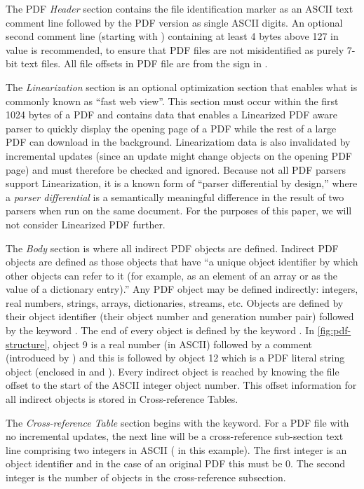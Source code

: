 The PDF \emph{Header} section contains the file identification marker as an ASCII
text comment line  followed by the PDF version as single ASCII digits. 
An optional second comment line (starting with \lstcd{\%})
containing at least 4 bytes above 127 in value is recommended, to ensure 
that PDF files are not misidentified as purely 7-bit text files. 
All file offsets in PDF file are from the \lstcd{\%} sign in .  

The \emph{Linearization} section is an optional optimization section that enables what is commonly
known as ``fast web view''. This section must occur within the first 1024 bytes of a PDF and contains
data that enables a Linearized PDF aware parser to quickly display the opening page of a PDF
while the rest of a large PDF can download in the background.
Linearizatiom data is also invalidated by incremental updates (since an update might change objects
on the opening PDF page) and must therefore be checked and ignored.
%
Because not all PDF parsers support Linearization, it is a known form
of ``parser differential by design,'' where a \emph{parser
  differential} is a semantically meaningful difference in the result
of two parsers when run on the same document.
%
For the purposes of this paper, we will not consider Linearized PDF further.

The \emph{Body} section is where all indirect PDF objects are defined. Indirect PDF objects
are defined as those objects that have ``a unique object identifier by which other objects can
refer to it (for example, as an element of an array or as the value of a dictionary entry).''
Any PDF object may be defined indirectly: integers, real numbers, strings, arrays, dictionaries, 
streams, etc. Objects are defined by their object identifier (their object number and generation 
number pair) followed by the keyword . 
The end of every object is defined by the keyword .
In \cref{fig:pdf-structure}, object 9 is a real number (in ASCII) followed by a comment
(introduced by \lstcd{\%}) and this is followed by object 12 which is a PDF literal string object
(enclosed in \lstcd{(} and \lstcd{)}).  
Every indirect object is reached by knowing the file offset to the start of the ASCII integer 
object number. This offset information for all indirect objects is stored in Cross-reference Tables.

The \emph{Cross-reference Table} section begins with the  keyword. For a PDF file
with no incremental updates, the next line will be a cross-reference sub-section text line comprising
two integers in ASCII ( in this example). The first integer is an object identifier 
and in the case of an original PDF this must be 0. The second integer is the number of
objects in the cross-reference subsection.

